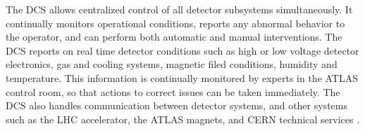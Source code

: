 	The DCS allows centralized control of all detector subsystems simultaneously. It continually monitors operational conditions, reports any abnormal behavior to the operator, and can perform both automatic and manual interventions. The DCS reports on real time detector conditions such as high or low voltage detector electronics, gas and cooling systems, magnetic filed conditions, humidity and temperature. This information is continually monitored by experts in the ATLAS control room, so that actions to correct issues can be taken immediately. The DCS also handles communication between detector systems, and other systems such as the LHC accelerator, the ATLAS magnets, and CERN technical services \cite{atlas_overview}. 

